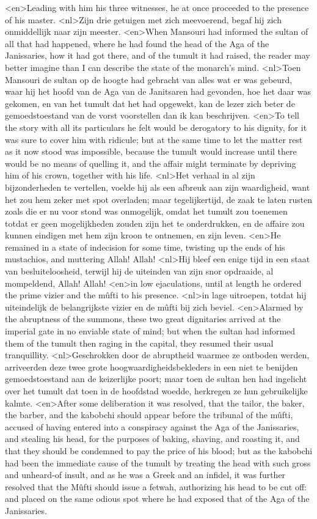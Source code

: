 <en>Leading with him his three witnesses, he at once proceeded to the presence of his master.
<nl>Zijn drie getuigen met zich meevoerend,  begaf  hij zich onmiddellijk naar zijn meester.
<en>When Mansouri had informed the sultan of all that had happened, where he had found the head of the Aga of the Janissaries, how it had got there, and of the tumult it had raised, the reader may better imagine than I can describe the state of the monarch's mind.
<nl>Toen Mansouri de sultan op de hoogte had gebracht van alles wat er was gebeurd, waar hij het hoofd van de Aga van de Janitsaren had gevonden, hoe het daar was gekomen, en van het tumult dat het had opgewekt, kan de lezer zich beter de gemoedstoestand van de vorst voorstellen dan ik kan beschrijven.
<en>To tell the story with all its particulars he felt would be derogatory to his dignity, for it was sure to cover him with ridicule; but at the same time to let the matter rest as it now stood was impossible, because the tumult would increase until there would be no means of quelling it, and the affair might terminate by depriving him of his crown, together with his life.
<nl>Het verhaal in al zijn bijzonderheden te vertellen, voelde hij als een afbreuk aan zijn waardigheid, want het zou  hem zeker met spot overladen; maar tegelijkertijd, de zaak te laten rusten zoals die er nu voor stond was onmogelijk, omdat het tumult zou toenemen totdat er geen mogelijkheden zouden zijn  het te onderdrukken, en de affaire zou kunnen eindigen met hem zijn kroon te ontnemen, en zijn leven.
<en>He remained in a state of indecision for some time, twisting up the ends of his mustachios, and muttering Allah! Allah!
<nl>Hij bleef een enige tijd in een staat van besluiteloosheid, terwijl hij de uiteinden van zijn snor opdraaide, al mompeldend,  Allah! Allah!
<en>in low ejaculations, until at length he ordered the prime vizier and the mûfti to his presence.
<nl>in lage uitroepen, totdat hij uiteindelijk  de belangrijkste vizier en de mûfti bij zich beviel.
<en>Alarmed by the abruptness of the summons, these two great dignitaries arrived at the imperial gate in no enviable state of mind; but when the sultan had informed them of the tumult then raging in the capital, they resumed their usual tranquillity.
<nl>Geschrokken door de abruptheid waarmee ze ontboden werden, arriveerden deze twee grote hoogwaardigheidsbekleders in een niet te benijden gemoedstoestand aan de keizerlijke poort; maar toen de sultan hen had ingelicht over het tumult dat toen in de hoofdstad woedde, herkregen ze hun gebruikelijke kalmte.
<en>After some deliberation it was resolved, that the tailor, the baker, the barber, and the kabobchi should appear before the tribunal of the mûfti, accused of having entered into a conspiracy against the Aga of the Janissaries, and stealing his head, for the purposes of baking, shaving, and roasting it, and that they should be condemned to pay the price of his blood; but as the kabobchi had been the immediate cause of the tumult by treating the head with such gross and unheard-of insult, and as he was a Greek and an infidel, it was further resolved that the Mûfti should issue a fetwah, authorizing his head to be cut off: and placed on the same odious spot where he had exposed that of the Aga of the Janissaries.
